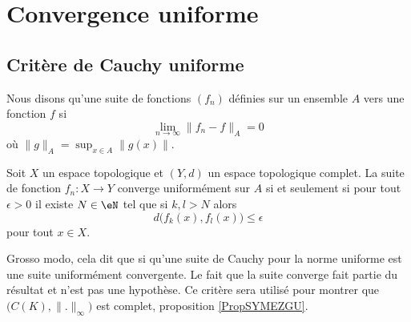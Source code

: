  
\section{Convergence uniforme}

\subsection{Critère de Cauchy uniforme}

\begin{definition}
    Nous disons qu'une suite de fonctions \( (f_n)\) définies sur un ensemble \( A\)  vers une fonction \( f\) si
    \begin{equation}
        \lim_{n\to \infty} \| f_n-f \|_A=0
    \end{equation}
    où \( \| g \|_A=\sup_{x\in A}\| g(x) \|\).
\end{definition}

\begin{proposition}   \label{PropNTEynwq}
    Soit \( X\) un espace topologique et \( (Y,d)\) un espace topologique complet. La suite de fonction \( f_n\colon X\to Y\) converge uniformément sur \( A\) si et seulement si pour tout \( \epsilon>0\) il existe \( N\in \eN\) tel que si \( k,l>N\) alors
    \begin{equation}
        d\big( f_k(x),f_l(x) \big)\leq \epsilon
    \end{equation}
    pour tout \( x\in X\).
\end{proposition}
Grosso modo, cela dit que si qu'une suite de Cauchy pour la norme uniforme est une suite uniformément convergente. Le fait que la suite converge fait partie du résultat et n'est pas une hypothèse. Ce critère sera utilisé pour montrer que \( \big( C(K),\| . \|_{\infty} \big)\) est complet, proposition \ref{PropSYMEZGU}. 

